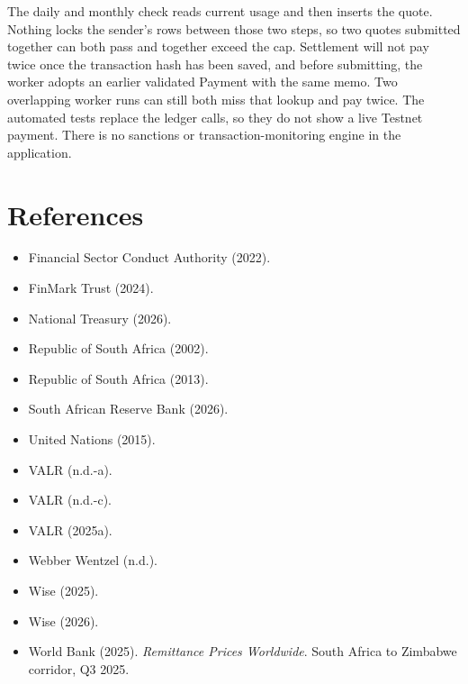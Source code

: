 \documentclass[11pt,a4paper]{article}
\begin{document}
The daily and monthly check reads current usage and then inserts the quote. Nothing locks the sender's rows between those two steps, so two quotes submitted together can both pass and together exceed the cap. Settlement will not pay twice once the transaction hash has been saved, and before submitting, the worker adopts an earlier validated Payment with the same memo. Two overlapping worker runs can still both miss that lookup and pay twice. The automated tests replace the ledger calls, so they do not show a live Testnet payment. There is no sanctions or transaction-monitoring engine in the application.

\section*{References}
\begin{itemize}[leftmargin=1.5em, label={}]
  \item Financial Sector Conduct Authority (2022). %
  \item FinMark Trust (2024). %
  \item National Treasury (2026). %
  \item Republic of South Africa (2002). %
  \item Republic of South Africa (2013). %
  \item South African Reserve Bank (2026). %
  \item United Nations (2015). %
  \item VALR (n.d.-a). %
  \item VALR (n.d.-c). %
  \item VALR (2025a). %
  \item Webber Wentzel (n.d.). %
  \item Wise (2025). %
  \item Wise (2026). %
  \item World Bank (2025). \emph{Remittance Prices Worldwide}. South Africa to Zimbabwe corridor, Q3 2025.
\end{itemize}
\end{document}
